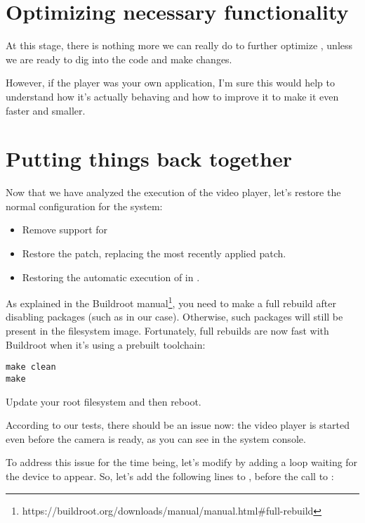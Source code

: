 \section{Optimizing necessary functionality}

At this stage, there is nothing more we can really do to further
optimize , unless we are ready to dig into the code and
make changes.

However, if the player was your own application, I'm sure this would
help to understand how it's actually behaving and how to improve it to
make it even faster and smaller.

\section{Putting things back together}

Now that we have analyzed the execution of the video player, let's
restore the normal configuration for the system:

\begin{itemize}
\item Remove support for 
\item Restore the
       patch,
      replacing the most recently applied patch.
\item Restoring the automatic execution of  in
      .
\end{itemize}


As explained in the Buildroot
manual\footnote{https://buildroot.org/downloads/manual/manual.html\#full-rebuild},
you need to make a full rebuild after disabling packages (such as
 in our case). Otherwise, such packages will still be present in the
filesystem image. Fortunately, full rebuilds are now fast with Buildroot
when it's using a prebuilt toolchain:

\begin{verbatim}
make clean
make
\end{verbatim}

Update your root filesystem and then reboot.

According to our tests, there should be an issue now: the video player
is started even before the camera is ready, as you can see in the system
console.

To address this issue for the time being, let's modify 
by adding a loop waiting for the  device to appear.
So, let's add the following lines to
,
before the call to :

